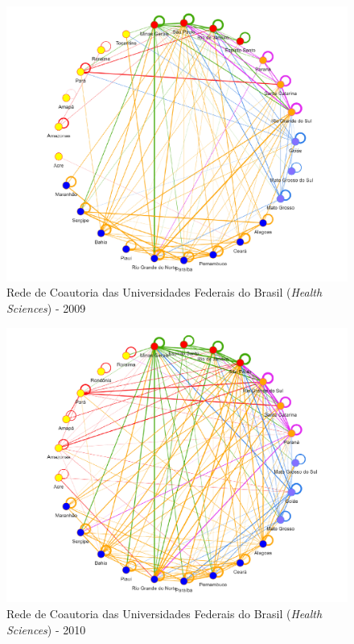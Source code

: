\begin{figure}[H]
	\centering
	\includegraphics[width=\linewidth]{Imagens/rede-2009.pdf}
	\caption{Rede de Coautoria das Universidades Federais do Brasil (\textit{Health Sciences}) - 2009}
	\label{Rede de Coautoria - UF BR 2009}
\end{figure}

\begin{figure}[H]
	\centering
	\includegraphics[width=\linewidth]{Imagens/rede-2010.pdf}
	\caption{Rede de Coautoria das Universidades Federais do Brasil (\textit{Health Sciences}) - 2010}
	\label{Rede de Coautoria - UF BR 2010}
\end{figure}

